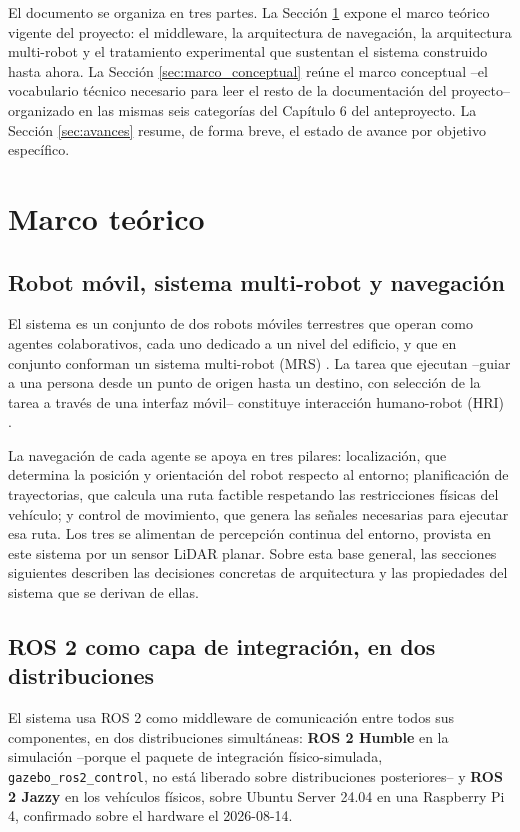 \documentclass[12pt,letterpaper]{article}
\begin{document}
El documento se organiza en tres partes. La Sección \ref{sec:marco_teorico} expone el marco teórico vigente del proyecto: el middleware, la arquitectura de navegación, la arquitectura multi-robot y el tratamiento experimental que sustentan el sistema construido hasta ahora. La Sección \ref{sec:marco_conceptual} reúne el marco conceptual --el vocabulario técnico necesario para leer el resto de la documentación del proyecto-- organizado en las mismas seis categorías del Capítulo 6 del anteproyecto. La Sección \ref{sec:avances} resume, de forma breve, el estado de avance por objetivo específico.

\section{Marco teórico}
\label{sec:marco_teorico}

\subsection{Robot móvil, sistema multi-robot y navegación}

El sistema es un conjunto de dos robots móviles terrestres que operan como agentes colaborativos, cada uno dedicado a un nivel del edificio, y que en conjunto conforman un sistema multi-robot (MRS) \cite{varghese_mrs}. La tarea que ejecutan --guiar a una persona desde un punto de origen hasta un destino, con selección de la tarea a través de una interfaz móvil-- constituye interacción humano-robot (HRI) \cite{jimenez_hri}.

La navegación de cada agente se apoya en tres pilares: localización, que determina la posición y orientación del robot respecto al entorno; planificación de trayectorias, que calcula una ruta factible respetando las restricciones físicas del vehículo; y control de movimiento, que genera las señales necesarias para ejecutar esa ruta. Los tres se alimentan de percepción continua del entorno, provista en este sistema por un sensor LiDAR planar. Sobre esta base general, las secciones siguientes describen las decisiones concretas de arquitectura y las propiedades del sistema que se derivan de ellas.

\subsection{ROS 2 como capa de integración, en dos distribuciones}

El sistema usa ROS 2 \cite{macenski_ros2} como middleware de comunicación entre todos sus componentes, en dos distribuciones simultáneas: \textbf{ROS 2 Humble} en la simulación --porque el paquete de integración físico-simulada, \texttt{gazebo\_ros2\_control}, no está liberado sobre distribuciones posteriores-- y \textbf{ROS 2 Jazzy} en los vehículos físicos, sobre Ubuntu Server 24.04 en una Raspberry Pi 4, confirmado sobre el hardware el 2026-08-14.
\end{document}
